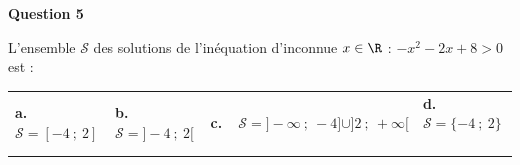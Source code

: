 \medskip

\textbf{Question 5}

\medskip

L’ensemble  $\mathcal{S}$ des solutions de l’inéquation d’inconnue $x\in\R$ : $-x^2-2x+8>0$ est :

\medskip

\begin{tabularx}{\linewidth}{*{4}{X}}
\textbf{a.~~} $\mathcal{S} = [-4~;~2]$&\textbf{b.~~} $\mathcal{S}=]-4~;~2[$&\textbf{c.~~}\footnotesize $\mathcal{S} = ]-\infty~;~-4]\cup]2~;~+\infty[$&\textbf{d.~~}  $\mathcal{S} = \{-4~;~2\}$\
\end{tabularx}

\vspace{0,5cm}
